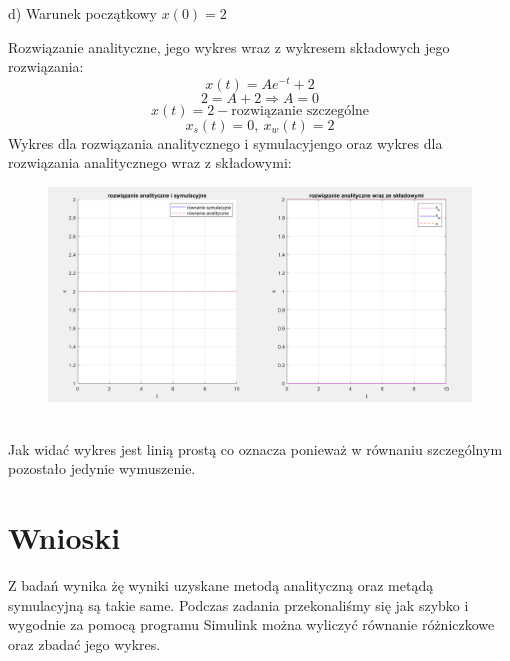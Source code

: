 \documentclass{article}
\begin{document}
\begin{flushleft}
d) Warunek początkowy $x(0)=2$\\
\end{flushleft}
Rozwiązanie analityczne, jego wykres wraz z wykresem składowych jego rozwiązania:\\
$$
x(t)=Ae^{-t}+2
$$
$$
2=A+2 \Rightarrow A=0
$$
$$
x(t)=2-\text{rozwiązanie szczególne}
$$
$$
x_s(t)=0, \  x_w(t)=2
$$
\newpage
Wykres dla rozwiązania analitycznego i symulacyjengo oraz wykres dla rozwiązania analitycznego wraz z składowymi:\\
\begin{figure}[h!]
    \centering
    \includegraphics[width=\textwidth]{POPRAWAwykresD.png}
    \label{fig:my_label}
\end{figure}\\
Jak widać wykres jest linią prostą co oznacza ponieważ w równaniu szczególnym pozostało jedynie wymuszenie.

\section{Wnioski}
Z badań wynika żę wyniki uzyskane metodą analityczną oraz metądą symulacyjną są takie same. Podczas zadania przekonaliśmy się jak szybko i wygodnie za pomocą programu Simulink można wyliczyć równanie różniczkowe oraz zbadać jego wykres. 
\end{document}
